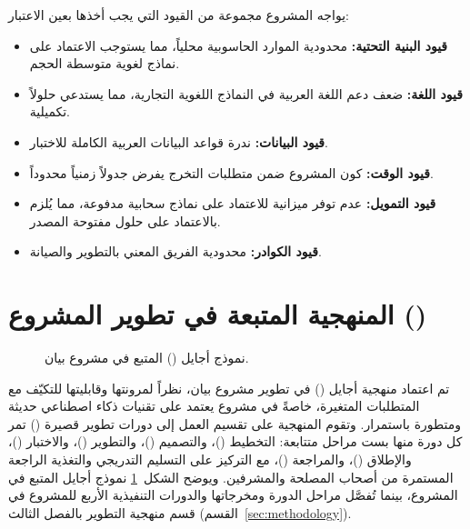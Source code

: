 يواجه المشروع مجموعة من القيود التي يجب أخذها بعين الاعتبار:
\begin{itemize}
  \item \textbf{قيود البنية التحتية:} محدودية الموارد الحاسوبية محلياً، مما
        يستوجب الاعتماد على نماذج لغوية متوسطة الحجم.
  \item \textbf{قيود اللغة:} ضعف دعم اللغة العربية في النماذج اللغوية
        التجارية، مما يستدعي حلولاً تكميلية.
  \item \textbf{قيود البيانات:} ندرة قواعد البيانات العربية الكاملة للاختبار.
  \item \textbf{قيود الوقت:} كون المشروع ضمن متطلبات التخرج يفرض جدولاً زمنياً
        محدوداً.
  \item \textbf{قيود التمويل:} عدم توفر ميزانية للاعتماد على نماذج سحابية
        مدفوعة، مما يُلزم بالاعتماد على حلول مفتوحة المصدر.
  \item \textbf{قيود الكوادر:} محدودية الفريق المعني بالتطوير والصيانة.
\end{itemize}

\section{المنهجية المتبعة في تطوير المشروع ()}
\label{sec:agile}

\begin{figure}[H]
  \centering
  \resizebox{0.7\textwidth}{!}{}
  \caption{نموذج أجايل () المتبع في مشروع بيان.}
  \label{fig:agile}
\end{figure}

تم اعتماد منهجية أجايل () في تطوير مشروع بيان، نظراً لمرونتها
وقابليتها للتكيّف مع المتطلبات المتغيرة، خاصةً في مشروع يعتمد على تقنيات
ذكاء اصطناعي حديثة ومتطورة باستمرار. وتقوم المنهجية على تقسيم العمل إلى دورات
تطوير قصيرة () تمر كل دورة منها بست مراحل متتابعة: التخطيط
()، والتصميم ()، والتطوير ()،
والاختبار ()، والإطلاق ()، والمراجعة
()، مع التركيز على التسليم التدريجي والتغذية الراجعة المستمرة من
أصحاب المصلحة والمشرفين. ويوضح الشكل~\ref{fig:agile} نموذج أجايل المتبع في
المشروع، بينما تُفصَّل مراحل الدورة ومخرجاتها والدورات التنفيذية الأربع
للمشروع في قسم منهجية التطوير بالفصل الثالث
(القسم~\ref{sec:methodology}).

